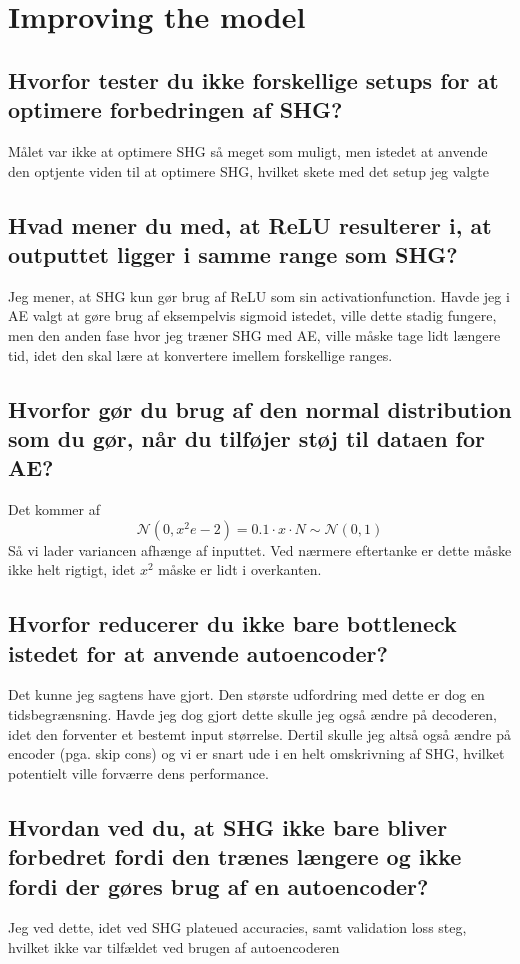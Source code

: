 \documentclass[a4paper]{article}
\begin{document}
\section{Improving the model}
\subsection{Hvorfor tester du ikke forskellige setups for at optimere forbedringen af SHG?}
Målet var ikke at optimere SHG så meget som muligt, men istedet at anvende den optjente viden til at optimere SHG, hvilket skete med det setup jeg valgte

\subsection{Hvad mener du med, at ReLU resulterer i, at outputtet ligger i samme range som SHG?}
Jeg mener, at SHG kun gør brug af ReLU som sin activationfunction. Havde jeg i AE valgt at gøre brug af eksempelvis sigmoid istedet, ville dette stadig fungere, men den anden fase hvor jeg træner SHG med AE, ville måske tage lidt længere tid, idet den skal lære at konvertere imellem forskellige ranges. 

\subsection{Hvorfor gør du brug af den normal distribution som du gør, når du tilføjer støj til dataen for AE?}
Det kommer af
$$\mathcal{N} \left(0, x^2e-2 \right) = 0.1 \cdot x \cdot N \sim \mathcal{N} \left( 0, 1 \right)$$
Så vi lader variancen afhænge af inputtet. Ved nærmere eftertanke er dette måske ikke helt rigtigt, idet $x^2$ måske er lidt i overkanten.

\subsection{Hvorfor reducerer du ikke bare bottleneck istedet for at anvende autoencoder?}
Det kunne jeg sagtens have gjort. Den største udfordring med dette er dog en tidsbegrænsning. Havde jeg dog gjort dette skulle jeg også ændre på decoderen, idet den forventer et bestemt input størrelse. Dertil skulle jeg altså også ændre på encoder (pga. skip cons) og vi er snart ude i en helt omskrivning af SHG, hvilket potentielt ville forværre dens performance.

\subsection{Hvordan ved du, at SHG ikke bare bliver forbedret fordi den trænes længere og ikke fordi der gøres brug af en autoencoder?}
Jeg ved dette, idet ved SHG plateued accuracies, samt validation loss steg, hvilket ikke var tilfældet ved brugen af autoencoderen
\end{document}
